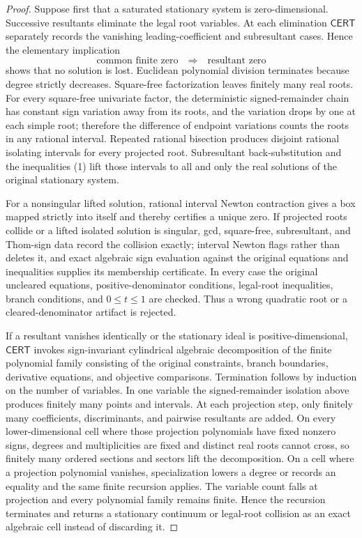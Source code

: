 \documentclass{article}
\begin{document}
\begin{proof}
Suppose first that a saturated stationary system is zero-dimensional.  Successive resultants eliminate the legal root variables.  At each elimination \(\mathsf{CERT}\) separately records the vanishing leading-coefficient and subresultant cases.  Hence the elementary implication
\[
 \text{common finite zero}\quad\Longrightarrow\quad\text{resultant zero} \tag{10}
\]
shows that no solution is lost.  Euclidean polynomial division terminates because degree strictly decreases.  Square-free factorization leaves finitely many real roots.  For every square-free univariate factor, the deterministic signed-remainder chain has constant sign variation away from its roots, and the variation drops by one at each simple root; therefore the difference of endpoint variations counts the roots in any rational interval.  Repeated rational bisection produces disjoint rational isolating intervals for every projected root.  Subresultant back-substitution and the inequalities (1) lift those intervals to all and only the real solutions of the original stationary system.

For a nonsingular lifted solution, rational interval Newton contraction gives a box mapped strictly into itself and thereby certifies a unique zero.  If projected roots collide or a lifted isolated solution is singular, gcd, square-free, subresultant, and Thom-sign data record the collision exactly; interval Newton flags rather than deletes it, and exact algebraic sign evaluation against the original equations and inequalities supplies its membership certificate.  In every case the original uncleared equations, positive-denominator conditions, legal-root inequalities, branch conditions, and \(0\leq t\leq1\) are checked.  Thus a wrong quadratic root or a cleared-denominator artifact is rejected.

If a resultant vanishes identically or the stationary ideal is positive-dimensional, \(\mathsf{CERT}\) invokes sign-invariant cylindrical algebraic decomposition of the finite polynomial family consisting of the original constraints, branch boundaries, derivative equations, and objective comparisons.  Termination follows by induction on the number of variables.  In one variable the signed-remainder isolation above produces finitely many points and intervals.  At each projection step, only finitely many coefficients, discriminants, and pairwise resultants are added.  On every lower-dimensional cell where those projection polynomials have fixed nonzero signs, degrees and multiplicities are fixed and distinct real roots cannot cross, so finitely many ordered sections and sectors lift the decomposition.  On a cell where a projection polynomial vanishes, specialization lowers a degree or records an equality and the same finite recursion applies.  The variable count falls at projection and every polynomial family remains finite.  Hence the recursion terminates and returns a stationary continuum or legal-root collision as an exact algebraic cell instead of discarding it.


\end{proof}
\end{document}
